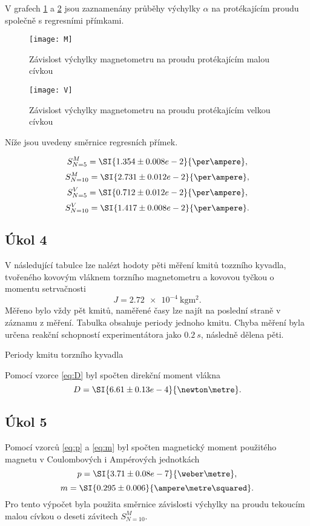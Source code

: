 \documentclass[0-protokol.tex]{subfiles}
\begin{document}
V grafech \ref{fig:M} a \ref{fig:V} jsou zaznamenány průběhy výchylky $\alpha$ na protékajícím proudu společně s regresními přímkami.

\begin{figure}[H]
\centering
\texttt{[image: M]}
\caption{Závislost výchylky magnetometru na proudu protékajícím malou cívkou}
\label{fig:M}
\end{figure}

\begin{figure}[H]
\centering
\texttt{[image: V]}
\caption{Závislost výchylky magnetometru na proudu protékajícím velkou cívkou}
\label{fig:V}
\end{figure}

Níže jsou uvedeny směrnice regresních přímek.

$$ S^M_{N=5} = \SI{1.354 \pm 0.008 e-2}{\per\ampere}, $$
$$ S^M_{N=10} = \SI{2.731 \pm 0.012 e-2}{\per\ampere}, $$
$$ S^V_{N=5} = \SI{0.712 \pm 0.012 e-2}{\per\ampere}, $$
$$ S^V_{N=10} = \SI{1.417 \pm 0.008 e-2}{\per\ampere}. $$

\subsection*{Úkol 4}

V následující tabulce lze nalézt hodoty pěti měření kmitů tozzního kyvadla, tvořeného kovovým vláknem torzního magnetometru a kovovou tyčkou o momentu setrvačnosti 
$$ J = \SI{2.72 e-4}{\kilogram\metre\squared}. $$
Měřeno bylo vždy pět kmitů, naměřené časy lze najít na poslední straně v záznamu z měření. Tabulka obsahuje periody jednoho kmitu. Chyba měření byla určena reakční schopností experimentátora jako $\SI{0.2}{s}$, následně dělena pěti.
\begin{table}[H] 
\centering
\setlength{\tabcolsep}{10pt}

\caption{Periody kmitu torzního kyvadla}
\label{tab:T}
\end{table}

Pomocí vzorce \eqref{eq:D} byl spočten direkční moment vlákna 
$$ D = \SI{6.61 \pm 0.13 e-4}{\newton\metre}. $$

\subsection*{Úkol 5}

Pomocí vzorců \eqref{eq:p} a \eqref{eq:m} byl spočten magnetický moment použitého magnetu v Coulombových i Ampérových jednotkách
$$ p = \SI{3.71 \pm 0.08 e-7}{\weber\metre}, $$
$$ m = \SI{0.295 \pm 0.006}{\ampere\metre\squared}. $$
Pro tento výpočet byla použita směrnice závislosti výchylky na proudu tekoucím malou cívkou o deseti závitech $S^M_{N=10}$.
\end{document}
